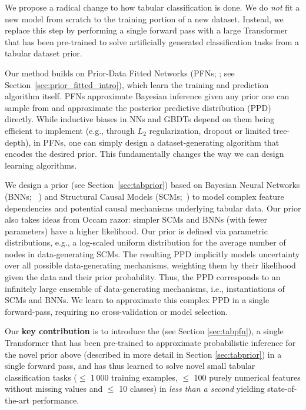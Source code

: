 \documentclass{article}
\begin{document}
We propose a radical change to how tabular classification is done. We do \emph{not} fit a new model from scratch to the training portion of a new dataset. Instead, we replace this step by performing a single forward pass with a large Transformer that has been pre-trained to solve artificially generated classification tasks from a tabular dataset prior.

Our method builds on Prior-Data Fitted Networks (PFNs; \citealp{muller-iclr22a}; see Section~\ref{sec:prior_fitted_intro}), which learn the training and prediction algorithm itself. PFNs approximate Bayesian inference given any prior one can sample from and approximate the posterior predictive distribution (PPD) directly. 
While inductive biases in NNs and GBDTs depend on them being efficient to implement (e.g., through $L_2$ regularization, dropout \citep{srivastava-jmlr14a} or limited tree-depth), in PFNs, one can simply design a dataset-generating algorithm that encodes the desired prior. This fundamentally changes the way we can design learning algorithms.

We design a prior (see Section~\ref{sec:tabprior}) based on Bayesian Neural Networks (BNNs; ~\citealt{neal-bayes96a,gal-phdthesis16a}) and Structural Causal Models (SCMs;~\citealt{pearl_2009,causalinferencelearningbook}) to model complex feature dependencies and potential causal mechanisms underlying tabular data. Our prior also takes ideas from Occam razor: simpler SCMs and BNNs (with fewer parameters) have a higher likelihood. Our prior is defined via parametric distributions, e.g., a log-scaled uniform distribution for the average number of nodes in data-generating SCMs. The resulting PPD implicitly models uncertainty over all possible data-generating mechanisms, weighting them by their likelihood given the data and their prior probability. Thus, the PPD corresponds to an infinitely large ensemble of data-generating mechanisms, i.e., instantiations of SCMs and BNNs. We learn to approximate this complex PPD in a single forward-pass, requiring no cross-validation or model selection.

Our \textbf{key contribution} is to introduce the \emph{\methodname{}} (see Section \ref{sec:tabpfn}), a single Transformer that has been pre-trained to approximate probabilistic inference for the novel prior above (described in more detail in Section \ref{sec:tabprior}) in a single forward pass, and has thus learned to solve novel small tabular classification tasks ($\le$ 1\,000 training examples, $\le$ 100 purely numerical features without missing values and $\le$ 10 classes) in \emph{less than a second} yielding state-of-the-art performance.
\end{document}
